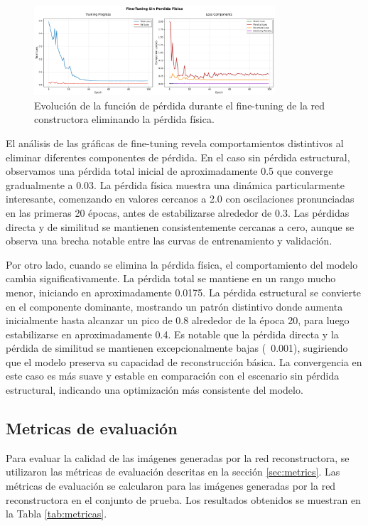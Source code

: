 \begin{figure}[H]
    \centering
    \includegraphics[width=0.8\textwidth]{Images/perdidas_entrenamiento_finetuning_no_phy.png}
    \caption{Evolución de la función de pérdida durante el fine-tuning de la red constructora eliminando la pérdida física.}
    \label{fig:ablation_no_phys}
\end{figure}

El análisis de las gráficas de fine-tuning revela comportamientos distintivos al eliminar diferentes componentes de pérdida. En el caso sin pérdida estructural, observamos una pérdida total inicial de aproximadamente 0.5 que converge gradualmente a 0.03. La pérdida física muestra una dinámica particularmente interesante, comenzando en valores cercanos a 2.0 con oscilaciones pronunciadas en las primeras 20 épocas, antes de estabilizarse alrededor de 0.3. Las pérdidas directa y de similitud se mantienen consistentemente cercanas a cero, aunque se observa una brecha notable entre las curvas de entrenamiento y validación.

Por otro lado, cuando se elimina la pérdida física, el comportamiento del modelo cambia significativamente. La pérdida total se mantiene en un rango mucho menor, iniciando en aproximadamente 0.0175. La pérdida estructural se convierte en el componente dominante, mostrando un patrón distintivo donde aumenta inicialmente hasta alcanzar un pico de 0.8 alrededor de la época 20, para luego estabilizarse en aproximadamente 0.4. Es notable que la pérdida directa y la pérdida de similitud se mantienen excepcionalmente bajas (~0.001), sugiriendo que el modelo preserva su capacidad de reconstrucción básica. La convergencia en este caso es más suave y estable en comparación con el escenario sin pérdida estructural, indicando una optimización más consistente del modelo.

\subsection{Metricas de evaluación}

Para evaluar la calidad de las imágenes generadas por la red reconstructora, se utilizaron las métricas de evaluación descritas en la sección \ref{sec:metrics}. Las métricas de evaluación se calcularon para las imágenes generadas por la red reconstructora en el conjunto de prueba. Los resultados obtenidos se muestran en la Tabla \ref{tab:metricas}.

